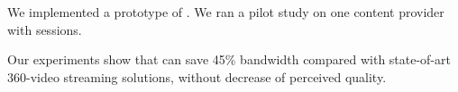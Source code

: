 \vspace{0.2cm}
We implemented a prototype of \name.
We ran a pilot study on one content provider with \fillme sessions. 

Our experiments show that \name can save 45\% bandwidth compared with state-of-art 360-video streaming solutions, without decrease of perceived quality.

